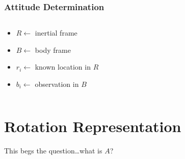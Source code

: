 \documentclass[11pt]{beamer}
\begin{document}
\begin{frame}
\begin{columns}
\begin{column}{0.5\textwidth}
            \end{column}
        \end{columns}
    \end{frame}

    \begin{frame}
        \frametitle{Attitude Determination}
        \begin{columns}
            \begin{column}{0.5\textwidth}
                \begin{itemize}
                    \item $R \gets$ inertial frame \bigskip
                    \item $B \gets$ body frame \bigskip
                    \item $r_i \gets$ known location in $R$ \bigskip
                    \item $b_i \gets$ observation in $B$
                \end{itemize} \bigskip
            \end{column}
            \begin{column}{0.55\textwidth}
            \end{column}
        \end{columns} \bigskip
    \end{frame}

    \section{Rotation Representation}\label{sec:rotationRepresentation}
    \begin{frame}
        \begin{center}
            \LARGE{This begs the question\ldots what is $A$?}
        \end{center}
    \end{frame}
\end{document}
